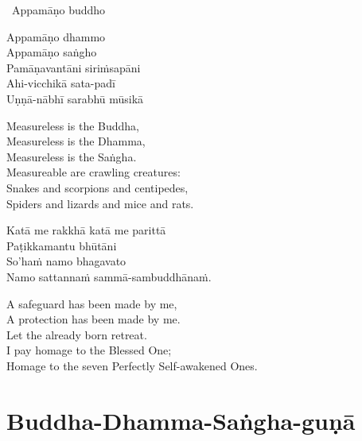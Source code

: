 \begin{leader-only}
  \anglebracketleft\ \hspace{-0.5mm}Appamāṇo buddho \hspace{-0.5mm}\anglebracketright\
\end{leader-only}

\vspace{-1em}

\begin{pali-hang-continued}
  Appamāṇo dhammo\\
  Appamāṇo saṅgho\\
  Pamāṇavantāni siriṁsapāni\\
  Ahi-vicchikā sata-padī\\
  Uṇṇā-nābhī sarabhū mūsikā
\end{pali-hang-continued}

\begin{english-verses}
  Measureless is the Buddha,\\
  Measureless is the Dhamma,\\
  Measureless is the Saṅgha.\\
  Measureable are crawling creatures:\\
  Snakes and scorpions and centipedes,\\
  Spiders and lizards and mice and rats.
\end{english-verses}

\begin{pali-hang-continued}
  Katā me rakkhā katā me parittā\\
  Paṭikkamantu bhūtāni\\
  So'haṁ namo bhagavato\\
  Namo sattannaṁ sammā-sambuddhānaṁ.
\end{pali-hang-continued}

\begin{english-verses}
  A safeguard has been made by me,\\
  A protection has been made by me.\\
  Let the already born retreat.\\
  I pay homage to the Blessed One;\\
  Homage to the seven Perfectly Self-awakened Ones.
\end{english-verses}

\suttaRef{[AN 4.67]}

\section{Buddha-Dhamma-Saṅgha-guṇā}
\label{buddha-dhamma-sangha-guna}

